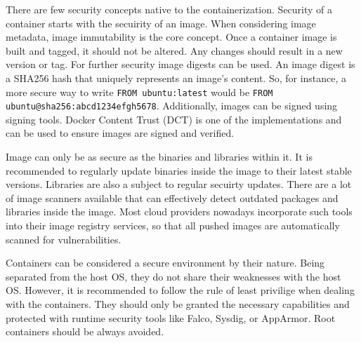 There are few security concepts native to the containerization. Security of a container starts with the secuirity of an image. When considering image metadata, image immutability is the core concept. Once a container image is built and tagged, it should not be altered. Any changes should result in a new version or tag. For further security image digests can be used. An image digest is a SHA256 hash that uniquely represents an image's content. So, for instance, a more secure way to write \lstinline{FROM ubuntu:latest} would be \lstinline{FROM ubuntu@sha256:abcd1234efgh5678}. Additionally, images can be signed using signing tools. Docker Content Trust (DCT) is one of the implementations and can be used to ensure images are signed and verified.

Image can only be as secure as the binaries and libraries within it. It is recommended to regularly update binaries inside the image to their latest stable versions. Libraries are also a subject to regular secuirty updates. There are a lot of image scanners available that can effectively detect outdated packages and libraries inside the image. Most cloud providers nowadays incorporate such tools into their image registry services, so that all pushed images are automatically scanned for vulnerabilities.

Containers can be considered a secure environment by their nature. Being separated from the host OS, they do not share their weaknesses with the host OS. However, it is recommended to follow the rule of least privilige when dealing with the containers. They should only be granted the necessary capabilities and protected with runtime security tools like Falco, Sysdig, or AppArmor. Root containers should be always avoided.